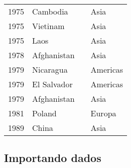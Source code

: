 \documentclass[11pt]{article}
\begin{document}
\begin{table}[htbp]
\begin{tabular}{rlll}
1975 & Cambodia &  & Asia\\
1975 & Vietinam &  & Asia\\
1975 & Laos &  & Asia\\
1978 & Afghanistan &  & Asia\\
1979 & Nicaragua &  & Americas\\
1979 & El Salvador &  & Americas\\
1979 & Afghanistan &  & Asia\\
1981 & Poland &  & Europa\\
1989 & China &  & Asia\\
\hline
\end{tabular}
\end{table}


\subsection*{Importando dados}
\label{sec:org2ae5444}
\end{document}
